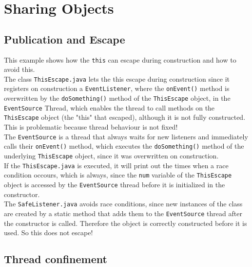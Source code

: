 \documentclass{article}
\begin{document}
  \section{Sharing Objects}

    \subsection{Publication and Escape}

    This example shows how the \texttt{this} can escape during construction and how to avoid this.
    \\
    The class \texttt{ThisEscape.java} lets the this escape during construction since it registers on construction a \texttt{EventListener}, where the \texttt{onEvent()} method is overwritten by the \texttt{doSomething()} method of the \texttt{ThisEscape} object, in the \texttt{EventSource} Thread, which enables the thread to call methods on the \texttt{ThisEscape} object (the "this" that escaped), although it is not fully constructed. This is problematic because thread behaviour is not fixed!
    \\
    The \texttt{EventSource} is a thread that always waits for new listeners and immediately calls their \texttt{onEvent()} method, which executes the \texttt{doSomething()} method of the underlying \texttt{ThisEscape} object, since it was overwritten on construction.
    \\
    If the \texttt{ThisEscape.java} is executed, it will print out the times when a race condition occours, which is always, since the \texttt{num} variable of the \texttt{ThisEscape} object is accessed by the \texttt{EventSource} thread before it is initialized in the constructor.
    \\
    The \texttt{SafeListener.java} avoids race conditions, since new instances of the class are created by a static method that adds them to the \texttt{EventSource} thread after the constructor is called. Therefore the object is correctly constructed before it is used. So this does not escape!

    \subsection{Thread confinement}
\end{document}
